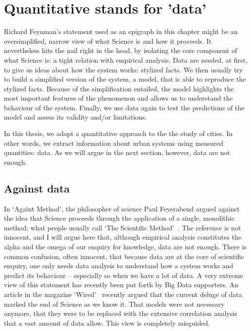 \section{Quantitative stands for 'data'}
\label{sec:quantitative_stands_for_data_}

Richard Feynman's statement used as an epigraph in this chapter might be an
oversimplified, narrow view of what Science is and how it proceeds. It
nevertheless hits the nail right in the head, by isolating the core component of
what Science is: a tight relation with empirical analysis. Data are needed, at
first, to give us ideas about how the system works: stylized facts. We then
usually try to build a simplified version of the system, a model, that is able
to reproduce the stylized facts. Because of the simplification entailed, the
model highlights the most important features of the phenomenon and allows us to
understand the behaviour of the system. Finally, we use data again to test the
predictions of the model and assess its validity and/or limitations.

In this thesis, we adopt a quantitative approach to the the study of cities. In
other words, we extract information about urban systems using measured quantities: data. As we will argue in the next section,
however, data are not enough.


\subsection{Against data}
\label{sec:against_data}

In `Againt Method', the philosopher of science Paul Feyerabend argued against
the idea that Science proceeds through the application of a single, monolithic
method; what people usually call `The Scientific Method'~\cite{Feyerabend:1975}.
The reference is not innocent, and I will argue here that, although empirical
analysis constitutes the alpha and the omega of our enquiry for knowledge, data
are not enough.
There is common confusion, often innocent, that because data are at the core of
scientific enquiry, one only needs data analysis to understand how a system
works and predict its behaviour -- especially so when we have a lot of data. A
very extreme view of this statement has recently been put forth by Big Data
supporters. An article in the magazine `Wired'~\cite{Anderson:2008} recently
argued that the current deluge of data marked the end of Science as we know it.
That models were not necessary anymore, that they were to be replaced with the
extensive correlation analysis that a vast amount of data allow. This view is
completely misguided.\\

